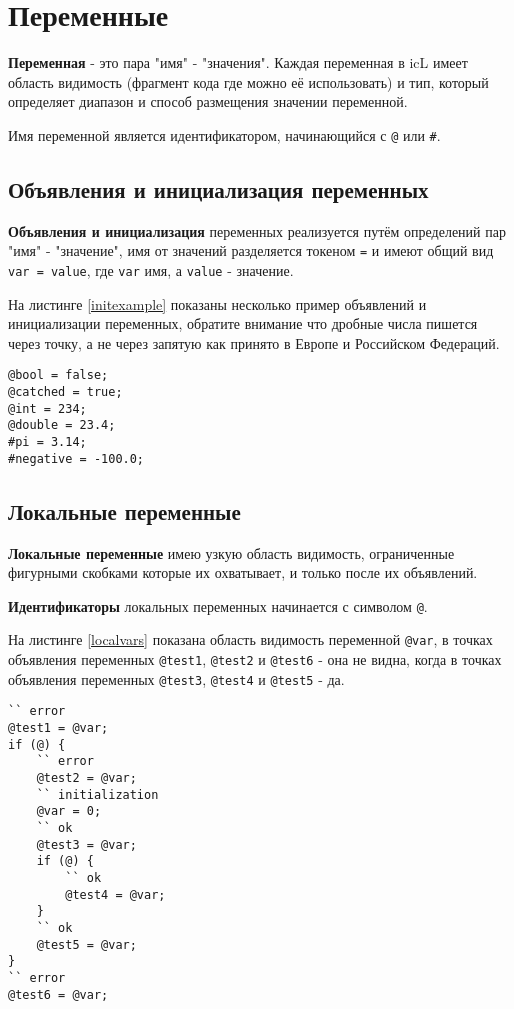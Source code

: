 \section{Переменные}

\textbf{Переменная} - это пара "имя" - "значения". Каждая переменная в icL имеет область видимость (фрагмент кода где можно её использовать) и тип, который определяет диапазон и способ размещения значении переменной.

Имя переменной является идентификатором, начинающийся с \lstinline|@| или {\color{blue2}\lstinline|#|}.

\subsection{Объявления и инициализация переменных}

\textbf{Объявления и инициализация} переменных реализуется путём определений пар "имя" - "значение", имя от значений разделяется токеном \lstinline|=| и имеют общий вид \lstinline|var = value|, где \lstinline|var| имя, а \lstinline|value| - значение.

На листинге \ref{initexample} показаны несколько пример объявлений и инициализации переменных, обратите внимание что дробные числа пишется через точку, а не через запятую как принято в Европе и Российском Федераций.

\begin{lstlisting}[caption=Пример объявлений и инициализации переменных,label=initexample]
@bool = false;
@catched = true;
@int = 234;
@double = 23.4;
#pi = 3.14;
#negative = -100.0;
\end{lstlisting}

\subsection{Локальные переменные}

\textbf{Локальные переменные} имею узкую область видимость, ограниченные фигурными скобками которые их охватывает, и только после их объявлений.

{\bf Идентификаторы} локальных переменных начинается с символом \lstinline|@|.

На листинге \ref{localvars} показана область видимость переменной \lstinline|@var|, в точках объявления переменных \lstinline|@test1|, \lstinline|@test2| и \lstinline|@test6| - она не видна, когда в точках объявления переменных \lstinline|@test3|, \lstinline|@test4| и \lstinline|@test5| - да.
\begin{lstlisting}[caption=Область видимости локальных перемен, label=localvars]
`` error
@test1 = @var;
if (@) {
	`` error
	@test2 = @var;
	`` initialization
	@var = 0;
	`` ok
	@test3 = @var;
	if (@) {
		`` ok
		@test4 = @var;
	}
	`` ok
	@test5 = @var;
}
`` error
@test6 = @var;
\end{lstlisting}

